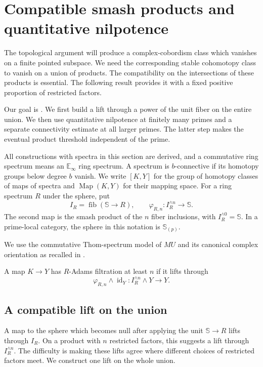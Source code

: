 \section{Compatible smash products and quantitative nilpotence}
\label{sec:filtered-products}

The topological argument will produce a complex-cobordism class which
vanishes on a finite pointed subspace.  We need the corresponding stable
cohomotopy class to vanish on a union of products.  The compatibility on
the intersections of these products is essential.  The following result
provides it with a fixed positive proportion of restricted factors.

Our goal is .  We first build a lift through
a power of the unit fiber on the entire union.  We then use quantitative
nilpotence at finitely many primes and a separate connectivity estimate
at all larger primes.  The latter step makes the eventual product
threshold independent of the prime.

All constructions with spectra in this section are derived, and a
commutative ring spectrum means an $\mathbb E_\infty$ ring spectrum.  A spectrum
is $b$-connective if its homotopy groups below degree $b$ vanish.  We write
$[K,Y]$ for the group of homotopy classes of maps of spectra and
$\operatorname{Map}(K,Y)$ for their mapping space.  For a ring spectrum
$R$ under the sphere, put
\[
I_R=\operatorname{fib}(\mathbb S\longrightarrow R),
\qquad
\varphi_{R,n}:I_R^{\wedge n}\longrightarrow\mathbb S.
\]
The second map is the smash product of the $n$ fiber inclusions, with
$I_R^{\wedge0}=\mathbb S$.  In a prime-local category, the sphere in this
notation is $\mathbb S_{(p)}$.

We use the commutative Thom-spectrum model of $MU$ and its canonical
complex orientation as recalled in
\cite[Lecture~6, Remarks~5 and~7 and Theorem~8]{Lurie2010}.

A map $K\to Y$ has $R$-Adams filtration at least $n$ if it lifts through
\[
\varphi_{R,n}\wedge\operatorname{id}_Y:
I_R^{\wedge n}\wedge Y\longrightarrow Y.
\]

\subsection{A compatible lift on the union}

A map to the sphere which becomes null after applying the unit
$\mathbb S\to R$ lifts through $I_R$.  On a product with $n$
restricted factors, this suggests a lift through $I_R^{\wedge n}$.
The difficulty is making these lifts agree where different choices
of restricted factors meet.  We construct one lift on the whole union.

